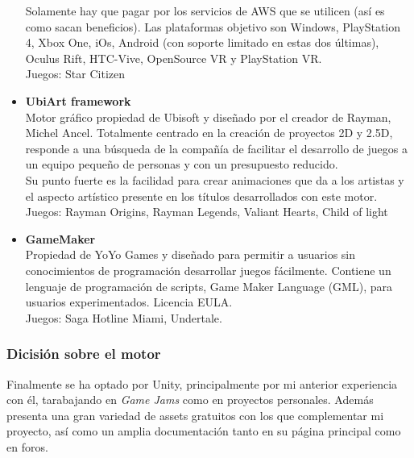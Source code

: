 \begin{itemize}
\quad Solamente hay que pagar por los servicios de AWS que se utilicen (así es como sacan beneficios). Las plataformas objetivo son Windows, PlayStation 4, Xbox One, iOs, Android (con soporte limitado en estas dos últimas), Oculus Rift, HTC-Vive, OpenSource VR y PlayStation VR.\\

\quad Juegos: Star Citizen\\

\item{\textbf{UbiArt framework}}\\

\quad Motor gráfico propiedad de Ubisoft y diseñado por el creador de Rayman, Michel Ancel. Totalmente centrado en la creación de proyectos 2D y 2.5D, responde a una
búsqueda de la compañía de facilitar el desarrollo de juegos a un equipo pequeño de personas y con un presupuesto reducido.\\

\quad Su punto fuerte es la facilidad para crear animaciones que da a los artistas y el aspecto artístico presente en los títulos desarrollados con este motor.\\

\quad Juegos: Rayman Origins, Rayman Legends, Valiant Hearts, Child of light \\

\item{\textbf{GameMaker}}\\

\quad Propiedad de YoYo Games y diseñado para permitir a usuarios sin conocimientos de programación desarrollar juegos fácilmente. Contiene un lenguaje de programación de scripts, Game Maker Language (GML), para usuarios experimentados. Licencia EULA.\\

\quad Juegos: Saga Hotline Miami, Undertale.\\
\end{itemize}

\subsubsection{Dicisión sobre el motor}
\quad Finalmente se ha optado por Unity, principalmente por mi anterior experiencia con él, tarabajando en \textit{Game Jams} como en proyectos personales. Además presenta una gran variedad de assets gratuitos con los que complementar mi proyecto, así como un amplia documentación tanto en su página principal como en foros.

